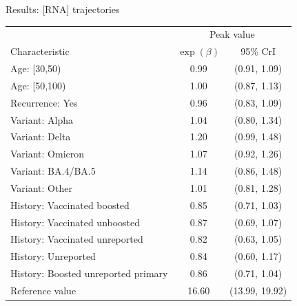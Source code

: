 \documentclass[9pt, aspectratio=169]{beamer}
\begin{document}
\begin{frame}{Results: [RNA] trajectories}
   \begin{table}[]
       \centering
       \begin{tabular}{lcc}
        \toprule
         & \multicolumn{2}{c}{Peak value} \\
        Characteristic & $\exp(\beta)$ & 95\% CrI\\
        \midrule
        Age: [30,50) & 0.99 & (0.91, 1.09)\\
        Age: [50,100) & 1.00 & (0.87, 1.13)\\
        Recurrence: Yes & 0.96 & (0.83, 1.09)\\
        Variant: Alpha & 1.04 & (0.80, 1.34)\\
        Variant: Delta & 1.20 & (0.99, 1.48)\\
        Variant: Omicron & 1.07 & (0.92, 1.26)\\
        Variant: BA.4/BA.5 & 1.14 & (0.86, 1.48)\\
        Variant: Other & 1.01 & (0.81, 1.28)\\
        History: Vaccinated boosted & 0.85 & (0.71, 1.03)\\
        History: Vaccinated unboosted & 0.87 & (0.69, 1.07)\\
        History: Vaccinated unreported & 0.82 & (0.63, 1.05)\\
        History: Unreported & 0.84 & (0.60, 1.17)\\
        History: Boosted unreported primary & 0.86 & (0.71, 1.04)\\
        \midrule
        Reference value & 16.60 & (13.99, 19.92)\\
        \bottomrule
        \end{tabular}
   \end{table}
\end{frame}
\end{document}
